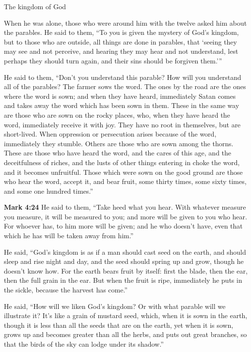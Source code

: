 \documentclass[10pt,a5paper,twoside]{article}
\newcommand{\quotesize}{\normalsize{}}
\newenvironment{quotetext}{\begingroup\quotesize}{\endgroup}
\newcommand{\intex}[1]{\index[texts]{#1}}
\newcommand{\bible}[2]{\begin{quotetext}\textbf{#1}\intex{#1} #2\end{quotetext}}
\newcommand{\gospelmark}[2]{\bible{Mark #1}{#2}}
\begin{document}
\begin{section}{The kingdom of God}
{  When he was alone, those who were around him with the twelve asked him about the parables.   He said to them, ``To you is given the mystery of God's kingdom, but to those who are outside, all things are done in parables,    that `seeing they may see and not perceive, and hearing they may hear and not understand, lest perhaps they should turn again, and their sins should be forgiven them.'{}''

  He said to them, ``Don't you understand this parable? How will you understand all of the parables?    The farmer sows the word.    The ones by the road are the ones where the word is sown; and when they have heard, immediately Satan comes and takes away the word which has been sown in them.    These in the same way are those who are sown on the rocky places, who, when they have heard the word, immediately receive it with joy.    They have no root in themselves, but are short-lived. When oppression or persecution arises because of the word, immediately they stumble.    Others are those who are sown among the thorns. These are those who have heard the word,    and the cares of this age, and the deceitfulness of riches, and the lusts of other things entering in choke the word, and it becomes unfruitful.    Those which were sown on the good ground are those who hear the word, accept it, and bear fruit, some thirty times, some sixty times, and some one hundred times.''}


\gospelmark{4:24}{
  He said to them, ``Take heed what you hear. With whatever measure you measure, it will be measured to you; and more will be given to you who hear.    For whoever has, to him more will be given; and he who doesn't have, even that which he has will be taken away from him.''

  He said, ``God's kingdom is as if a man should cast seed on the earth,    and should sleep and rise night and day, and the seed should spring up and grow, though he doesn't know how.    For the earth bears fruit by itself: first the blade, then the ear, then the full grain in the ear.    But when the fruit is ripe, immediately he puts in the sickle, because the harvest has come.''

  He said, ``How will we liken God's kingdom? Or with what parable will we illustrate it?    It's like a grain of mustard seed, which, when it is sown in the earth, though it is less than all the seeds that are on the earth,    yet when it is sown, grows up and becomes greater than all the herbs, and puts out great branches, so that the birds of the sky can lodge under its shadow.''

}
\end{section}
\end{document}
